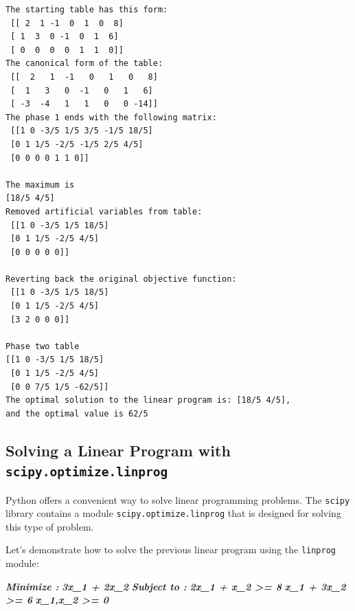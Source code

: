 \documentclass[11pt]{article}
\newenvironment{Shaded}{}{}
\newcommand{\InformationTok}[1]{\textcolor[rgb]{0.38,0.63,0.69}{\textbf{\textit{{#1}}}}}
\begin{document}
    \begin{Verbatim}[commandchars=\\\{\}]
The starting table has this form:
 [[ 2  1 -1  0  1  0  8]
 [ 1  3  0 -1  0  1  6]
 [ 0  0  0  0  1  1  0]]
The canonical form of the table:
 [[  2   1  -1   0   1   0   8]
 [  1   3   0  -1   0   1   6]
 [ -3  -4   1   1   0   0 -14]]
The phase 1 ends with the following matrix:
 [[1 0 -3/5 1/5 3/5 -1/5 18/5]
 [0 1 1/5 -2/5 -1/5 2/5 4/5]
 [0 0 0 0 1 1 0]]

The maximum is
[18/5 4/5]
Removed artificial variables from table:
 [[1 0 -3/5 1/5 18/5]
 [0 1 1/5 -2/5 4/5]
 [0 0 0 0 0]]

Reverting back the original objective function:
 [[1 0 -3/5 1/5 18/5]
 [0 1 1/5 -2/5 4/5]
 [3 2 0 0 0]]

Phase two table
[[1 0 -3/5 1/5 18/5]
 [0 1 1/5 -2/5 4/5]
 [0 0 7/5 1/5 -62/5]]
The optimal solution to the linear program is: [18/5 4/5],
and the optimal value is 62/5
    \end{Verbatim}

    \newpage

\subsection{\texorpdfstring{Solving a Linear Program with
\texttt{scipy.optimize.linprog}}{Solving a Linear Program with scipy.optimize.linprog}}\label{solving-a-linear-program-with-scipy.optimize.linprog}

Python offers a convenient way to solve linear programming problems. The
\texttt{scipy} library contains a module \texttt{scipy.optimize.linprog}
that is designed for solving this type of problem.

Let's demonstrate how to solve the previous linear program using the
\texttt{linprog} module:

\begin{Shaded}
\begin{Highlighting}[]
\InformationTok{          Minimize :}
\InformationTok{                     3x\_1 + 2x\_2}
\InformationTok{        Subject to :}
\InformationTok{                     2x\_1 + x\_2 \textgreater{}= 8}
\InformationTok{                      x\_1 + 3x\_2 \textgreater{}= 6}
\InformationTok{                         x\_1,x\_2 \textgreater{}= 0}
\end{Highlighting}
\end{Shaded}
\end{document}
